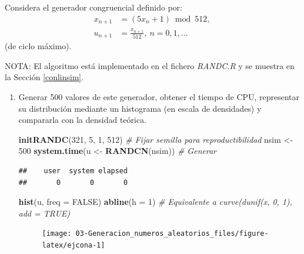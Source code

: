\documentclass[]{book}
\newenvironment{Shaded}{\begin{snugshade}}{\end{snugshade}}
\newcommand{\KeywordTok}[1]{\textcolor[rgb]{0.13,0.29,0.53}{\textbf{#1}}}
\newcommand{\DataTypeTok}[1]{\textcolor[rgb]{0.13,0.29,0.53}{#1}}
\newcommand{\DecValTok}[1]{\textcolor[rgb]{0.00,0.00,0.81}{#1}}
\newcommand{\StringTok}[1]{\textcolor[rgb]{0.31,0.60,0.02}{#1}}
\newcommand{\CommentTok}[1]{\textcolor[rgb]{0.56,0.35,0.01}{\textit{#1}}}
\newcommand{\OtherTok}[1]{\textcolor[rgb]{0.56,0.35,0.01}{#1}}
\newcommand{\NormalTok}[1]{#1}
\theoremstyle{definition}
\theoremstyle{definition}
\theoremstyle{definition}
\theoremstyle{remark}
\let\BeginKnitrBlock\begin \let\EndKnitrBlock\end
\begin{document}
\BeginKnitrBlock{exercise}
\protect\hypertarget{exr:unnamed-chunk-7}{}{\label{exr:unnamed-chunk-7} }
\EndKnitrBlock{exercise}

Considera el generador congruencial definido por: \[\begin{aligned}
x_{n+1}  & =(5x_{n}+1)\ \operatorname{mod}\ 512,\nonumber\\
u_{n+1}  & =\frac{x_{n+1}}{512},\ n=0,1,\dots\nonumber
\end{aligned}\] (de ciclo máximo).

NOTA: El algoritmo está implementado en el fichero \emph{RANDC.R} y se
muestra en la Sección \ref{conlinsim}.

\begin{enumerate}
\def\labelenumi{\alph{enumi})}
\item
  Generar 500 valores de este generador, obtener el tiempo de CPU,
  representar su distribución mediante un histograma (en escala de
  densidades) y compararla con la densidad teórica.

\begin{Shaded}
\begin{Highlighting}[]
\KeywordTok{initRANDC}\NormalTok{(}\DecValTok{321}\NormalTok{, }\DecValTok{5}\NormalTok{, }\DecValTok{1}\NormalTok{, }\DecValTok{512}\NormalTok{)       }\CommentTok{# Fijar semilla para reproductibilidad}
\NormalTok{nsim <-}\StringTok{ }\DecValTok{500}
\KeywordTok{system.time}\NormalTok{(u <-}\StringTok{ }\KeywordTok{RANDCN}\NormalTok{(nsim))  }\CommentTok{# Generar}
\end{Highlighting}
\end{Shaded}

\begin{verbatim}
##    user  system elapsed 
##       0       0       0
\end{verbatim}

\begin{Shaded}
\begin{Highlighting}[]
\KeywordTok{hist}\NormalTok{(u, }\DataTypeTok{freq =} \OtherTok{FALSE}\NormalTok{)}
\KeywordTok{abline}\NormalTok{(}\DataTypeTok{h =} \DecValTok{1}\NormalTok{)                   }\CommentTok{# Equivalente a curve(dunif(x, 0, 1), add = TRUE)}
\end{Highlighting}
\end{Shaded}

  \begin{figure}[!htb]

  {\centering \texttt{[image: 03-Generacion\_numeros\_aleatorios\_files/figure-latex/ejcona-1]} 

}
\end{figure}
\end{enumerate}
\end{document}
